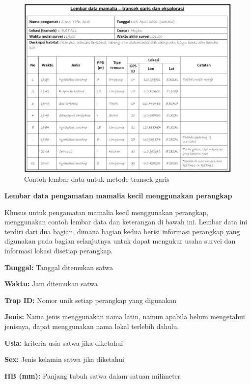 \documentclass[
]{book}
\begin{document}
\begin{figure}

{\centering \includegraphics[width=1\linewidth]{images/ldm_tg} 

}

\caption{Contoh lembar data untuk metode transek garis}\label{fig:ldmtg}
\end{figure}

\textbf{Lembar data pengamatan mamalia kecil menggunakan perangkap}

Khusus untuk pengamatan mamalia kecil menggunakan perangkap, menggunakan contoh lembar data dan keterangan di bawah ini. Lembar data ini terdiri dari dua bagian, dimana bagian kedua berisi informasi perangkap yang digunakan pada bagian selanjutnya untuk dapat mengukur usaha survei dan informasi lokasi disetiap perangkap.

\textbf{Tanggal:} Tanggal ditemukan satwa

\textbf{Waktu:} Jam ditemukan satwa

\textbf{Trap ID:} Nomor unik setiap perangkap yang digunakan

\textbf{Jenis:} Nama jenis menggunakan nama latin, namun apabila belum mengetahui jenisnya, dapat menggunakan nama lokal terlebih dahulu.

\textbf{Usia:} kriteria usia satwa jika diketahui

\textbf{Sex:} Jenis kelamin satwa jika diketahui

\textbf{HB (mm):} Panjang tubuh satwa dalam satuan milimeter
\end{document}
